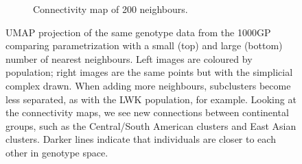 \documentclass[12pt]{article}
\begin{document}
\begin{figure}[h!]
\begin{subfigure}[b]{0.48\linewidth}
    \caption{Connectivity map of 200 neighbours.}
    \label{fig:UMAP_high_NN_connectivity}
  \end{subfigure}
  \caption{UMAP projection of the same genotype data from the 1000GP comparing parametrization with a small (top) and large (bottom) number of nearest neighbours. Left images are coloured by population; right images are the same points but with the simplicial complex drawn. When adding more neighbours, subclusters become less separated, as with the LWK population, for example. Looking at the connectivity maps, we see new connections between continental groups, such as the Central/South American clusters and East Asian clusters. Darker lines indicate that individuals are closer to each other in genotype space.}
  \label{fig:UMAP_connectivity}
\end{figure}

\clearpage
\newpage

%
%


\end{document}
